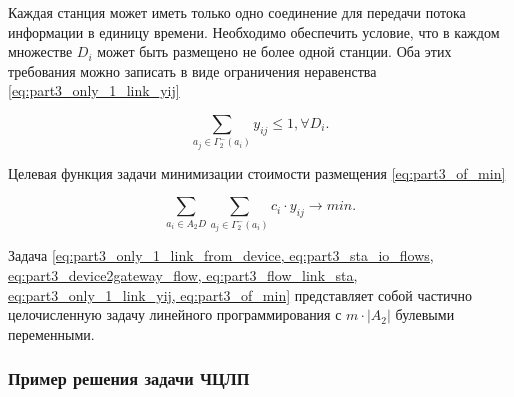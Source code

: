 Каждая станция может иметь только одно соединение для передачи потока информации в единицу времени. Необходимо обеспечить условие, что в каждом множестве $D_i$ может быть размещено не более одной станции. Оба этих требования можно записать в виде ограничения неравенства \cref{eq:part3_only_1_link_yij}

\begin{equation}\label{eq:part3_only_1_link_yij}
    \sum_{a_j \in \Gamma_2^-(a_i)} y_{ij} \leqslant 1, \forall D_i.
\end{equation}

Целевая функция задачи минимизации стоимости размещения \cref{eq:part3_of_min}

\begin{equation}\label{eq:part3_of_min}
    \sum_{a_i \in A_2D} \sum_{a_j \in \Gamma_2^-(a_i)}c_i \cdot y_{ij} \to min.
\end{equation}

Задача \cref{eq:part3_only_1_link_from_device, eq:part3_sta_io_flows, eq:part3_device2gateway_flow, eq:part3_flow_link_sta, eq:part3_only_1_link_yij, eq:part3_of_min} представляет собой частично целочисленную задачу линейного программирования с $m \cdot |A_2|$ булевыми переменными.

\subsubsection{Пример решения задачи ЧЦЛП}





  



